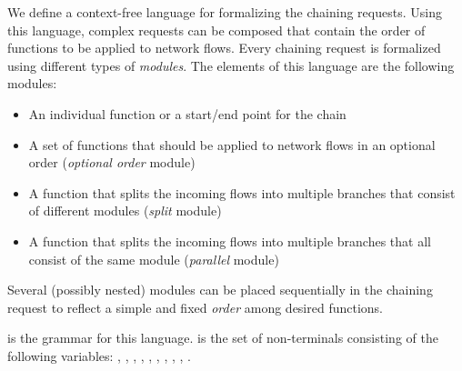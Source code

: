 \documentclass[10pt,a4paper,conference]{IEEEtran}
\begin{document}
We define a context-free language for formalizing the chaining requests. Using this 
language, complex requests can be composed that contain the order of functions to 
be applied to network flows. Every chaining request is 
formalized using different types of \emph{modules}. The elements of this language 
are the following modules:
\begin{itemize}
 \item An individual function or a start/end point for the chain
 \item A set of functions that should be applied to network flows in
 an optional order (\emph{optional order} module)
 \item A function that splits the incoming flows into multiple branches
 that consist of different modules (\emph{split} module)
 \item A function that splits the incoming flows into multiple branches 
 that all consist of the same module (\emph{parallel} module)
\end{itemize}

Several (possibly nested) modules can be placed sequentially in the chaining request
to reflect a simple and fixed \emph{order} among desired functions.
 
 is the grammar
for this language. 
 is the set of non-terminals consisting of the following variables:
, ,
, , ,
, , ,
, .
\end{document}
